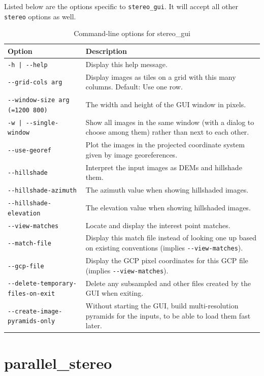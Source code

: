 \clearpage
Listed below are the options specific to \texttt{stereo\_gui}. It will accept
all other \texttt{stereo} options as well.

\begin{longtable}{|l|p{7.5cm}|}
\caption{Command-line options for stereo\_gui}
\label{tbl:stereogui}
\endfirsthead
\endhead
\endfoot
\endlastfoot
\hline
Option & Description \\ \hline \hline
\texttt{-h | -\/-help } & Display this help message.\\ \hline
\texttt{-\/-grid-cols arg} & Display images as tiles on a grid with this many columns. Default: Use one row.\\ \hline
\texttt{-\/-window-size arg (=1200 800)} & The width and height of the GUI window in pixels.\\ \hline
\texttt{-w | -\/-single-window } & Show all images in the same window (with a dialog to choose among them) rather than next to each other.\\ \hline
\texttt{-\/-use-georef} & Plot the images in the projected coordinate system given by image georeferences.\\ \hline
\texttt{-\/-hillshade} & Interpret the input images as DEMs and hillshade them.\\ \hline
\texttt{-\/-hillshade-azimuth} & The azimuth value when showing hillshaded images.\\ \hline
\texttt{-\/-hillshade-elevation} & The elevation value when showing hillshaded images.\\ \hline

\texttt{-\/-view-matches} & Locate and display the interest point matches.\\ \hline
\texttt{-\/-match-file} & Display this match file instead of looking one up based on existing conventions (implies \texttt{-\/-view-matches}). \\ \hline
\texttt{-\/-gcp-file} & Display the GCP pixel coordinates for this GCP file (implies \texttt{-\/-view-matches}). \\ \hline
\texttt{-\/-delete-temporary-files-on-exit} & Delete any subsampled and other files created by the GUI when exiting.\\ \hline
\texttt{-\/-create-image-pyramids-only} & Without starting the GUI, build multi-resolution pyramids for the inputs, to be able to load them fast later.\\ \hline
\end{longtable}

\section{parallel\_stereo}
\label{parallel}


